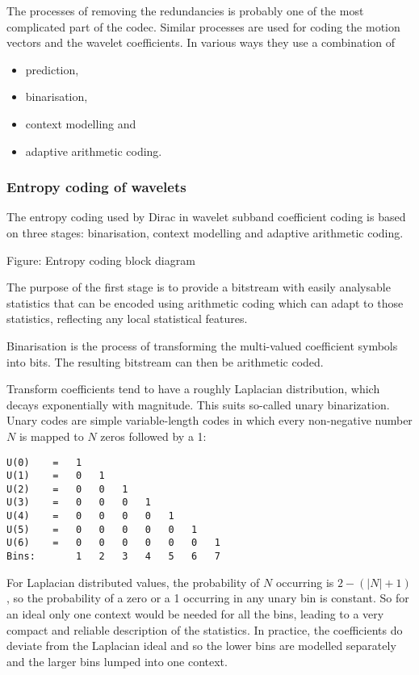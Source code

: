 The processes of removing the redundancies is probably one of the most
complicated part of the codec. Similar processes are used for coding the
motion vectors and the wavelet coefficients. In various ways they use a
combination of

\begin{itemize}
	\item prediction,
	\item binarisation,
	\item context modelling and
	\item adaptive arithmetic coding.
\end{itemize}

\subsubsection{Entropy coding of wavelets}

The entropy coding used by Dirac in wavelet subband coefficient coding
is based on three stages: binarisation, context modelling and adaptive
arithmetic coding.

Figure: Entropy coding block diagram

The purpose of the first stage is to provide a bitstream with easily
analysable statistics that can be encoded using arithmetic coding which
can adapt to those statistics, reflecting any local statistical
features.

Binarisation is the process of transforming the multi-valued coefficient
symbols into bits. The resulting bitstream can then be arithmetic coded.

Transform coefficients tend to have a roughly Laplacian distribution,
which decays exponentially with magnitude. This suits so-called unary
binarization. Unary codes are simple variable-length codes in which
every non-negative number $N$ is mapped to $N$ zeros followed by a 1:


\begin{verbatim}
U(0)    =   1
U(1)    =   0   1
U(2)    =   0   0   1
U(3)    =   0   0   0   1
U(4)    =   0   0   0   0   1
U(5)    =   0   0   0   0   0   1
U(6)    =   0   0   0   0   0   0   1
Bins:       1   2   3   4   5   6   7
\end{verbatim}

For Laplacian distributed values, the probability of $N$ occurring is
$2-(|N|+1)$, so the probability of a zero or a 1 occurring in any unary
bin is constant. So for an ideal only one context would be needed for
all the bins, leading to a very compact and reliable description of the
statistics. In practice, the coefficients do deviate from the Laplacian
ideal and so the lower bins are modelled separately and the larger bins
lumped into one context.

